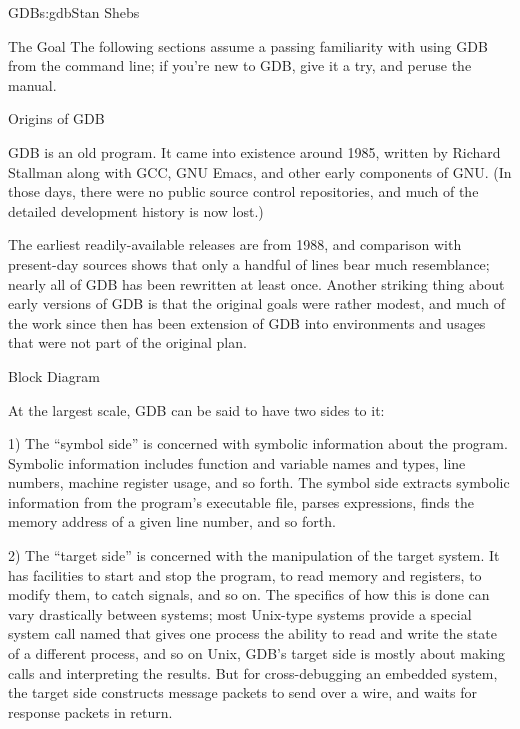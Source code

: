\begin{aosachapter}{GDB}{s:gdb}{Stan Shebs}
\begin{aosasect1}{The Goal}
The following sections assume a passing familiarity with using GDB
from the command line; if you're new to GDB, give it a try, and peruse
the manual.

\end{aosasect1}

\begin{aosasect1}{Origins of GDB}

GDB is an old program.  It came into existence around 1985, written by
Richard Stallman along with GCC, GNU Emacs, and other early components
of GNU.  (In those days, there were no public source control
repositories, and much of the detailed development history is now
lost.)

The earliest readily-available releases are from 1988, and comparison
with present-day sources shows that only a handful of lines bear much
resemblance; nearly all of GDB has been rewritten at least once.
Another striking thing about early versions of GDB is that the
original goals were rather modest, and much of the work since then has
been extension of GDB into environments and usages that were not part
of the original plan.

\end{aosasect1}

\begin{aosasect1}{Block Diagram}


At the largest scale, GDB can be said to have two sides to it:

1) The ``symbol side'' is concerned with symbolic information about
the program.  Symbolic information includes function and variable
names and types, line numbers, machine register usage, and so forth.
The symbol side extracts symbolic information from the program's
executable file, parses expressions, finds the memory address of a
given line number, and so forth.

2) The ``target side'' is concerned with the manipulation of the
target system.  It has facilities to start and stop the program, to
read memory and registers, to modify them, to catch signals, and so
on.  The specifics of how this is done can vary drastically between
systems; most Unix-type systems provide a special system call named
 that gives one process the ability to read and write the
state of a different process, and so on Unix, GDB's target side is
mostly about making  calls and interpreting the results.
But for cross-debugging an embedded system, the target side constructs
message packets to send over a wire, and waits for response packets in
return.


\end{aosasect1}
\end{aosachapter}
